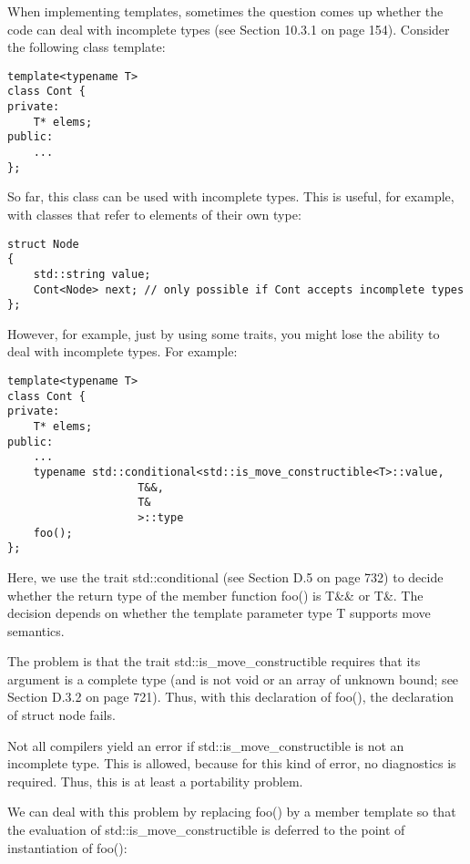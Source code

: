 When implementing templates, sometimes the question comes up whether the code can deal with incomplete types (see Section 10.3.1 on page 154). Consider the following class template:

\begin{lstlisting}[style=styleCXX]
template<typename T>
class Cont {
private:
	T* elems;
public:
	...
};
\end{lstlisting}

So far, this class can be used with incomplete types. This is useful, for example, with classes that refer to elements of their own type:

\begin{lstlisting}[style=styleCXX]
struct Node
{
	std::string value;
	Cont<Node> next; // only possible if Cont accepts incomplete types
};
\end{lstlisting}

However, for example, just by using some traits, you might lose the ability to deal with incomplete types. For example:

\begin{lstlisting}[style=styleCXX]
template<typename T>
class Cont {
private:
	T* elems;
public:
	...
	typename std::conditional<std::is_move_constructible<T>::value,
					T&&,
					T&
					>::type
	foo();
};
\end{lstlisting}

Here, we use the trait std::conditional (see Section D.5 on page 732) to decide whether the return type of the member function foo() is T\&\& or T\&. The decision depends on whether the template parameter type T supports move semantics. 

The problem is that the trait std::is\_move\_constructible requires that its argument is a complete type (and is not void or an array of unknown bound; see Section D.3.2 on page 721). Thus, with this declaration of foo(), the declaration of struct node fails.

\begin{tcolorbox}[colback=webgreen!5!white,colframe=webgreen!75!black]
\hspace*{0.75cm}Not all compilers yield an error if std::is\_move\_constructible is not an incomplete type. This is allowed, because for this kind of error, no diagnostics is required. Thus, this is at least a portability problem.
\end{tcolorbox}

We can deal with this problem by replacing foo() by a member template so that the evaluation of std::is\_move\_constructible is deferred to the point of instantiation of foo():

